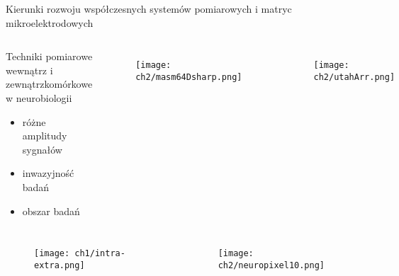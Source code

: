 \begin{frame}{Kierunki rozwoju współczesnych systemów pomiarowych i matryc mikroelektrodowych}
   
    \begin{columns}

    \begin{block}{Techniki pomiarowe wewnątrz i \\
        zewnątrzkomórkowe w neurobiologii}
        \begin{itemize}
            \item różne amplitudy sygnałów
            \item inwazyjność badań
            \item obszar badań 
        \end{itemize}
    \end{block}
    \vspace{-3em} %

        \begin{columns}
        \begin{figure}[H]
            \texttt{[image: ch2/masm64Dsharp.png]}
        \end{figure}

            \begin{figure}[H]
                \texttt{[image: ch2/utahArr.png]}
            \end{figure}
        \end{columns}
    \end{columns}

    \begin{columns}


        \begin{figure}[H]
            \texttt{[image: ch1/intra-extra.png]}  
        \end{figure}

        \vspace{-2em} %
        \begin{figure}[H]
            \texttt{[image: ch2/neuropixel10.png]}  
        \end{figure}


    \end{columns}


    
\end{frame}

